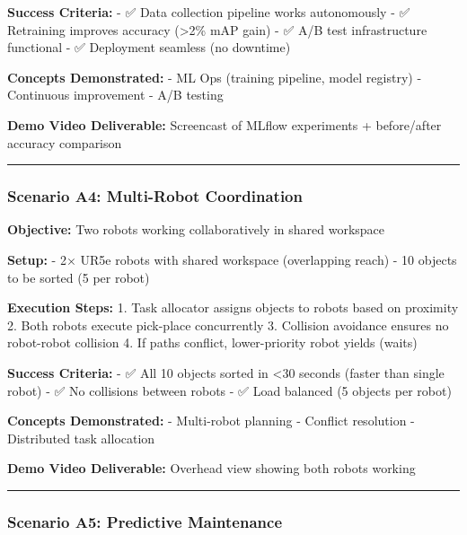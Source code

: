 \documentclass[
]{article}
\begin{document}
\textbf{Success Criteria:} - ✅ Data collection pipeline works
autonomously - ✅ Retraining improves accuracy (\textgreater2\% mAP
gain) - ✅ A/B test infrastructure functional - ✅ Deployment seamless
(no downtime)

\textbf{Concepts Demonstrated:} - ML Ops (training pipeline, model
registry) - Continuous improvement - A/B testing

\textbf{Demo Video Deliverable:} Screencast of MLflow experiments +
before/after accuracy comparison

\begin{center}\rule{0.5\linewidth}{0.5pt}\end{center}

\hypertarget{scenario-a4-multi-robot-coordination}{%
\subsubsection{Scenario A4: Multi-Robot
Coordination}\label{scenario-a4-multi-robot-coordination}}

\textbf{Objective:} Two robots working collaboratively in shared
workspace

\textbf{Setup:} - 2× UR5e robots with shared workspace (overlapping
reach) - 10 objects to be sorted (5 per robot)

\textbf{Execution Steps:} 1. Task allocator assigns objects to robots
based on proximity 2. Both robots execute pick-place concurrently 3.
Collision avoidance ensures no robot-robot collision 4. If paths
conflict, lower-priority robot yields (waits)

\textbf{Success Criteria:} - ✅ All 10 objects sorted in \textless30
seconds (faster than single robot) - ✅ No collisions between robots -
✅ Load balanced (5 objects per robot)

\textbf{Concepts Demonstrated:} - Multi-robot planning - Conflict
resolution - Distributed task allocation

\textbf{Demo Video Deliverable:} Overhead view showing both robots
working

\begin{center}\rule{0.5\linewidth}{0.5pt}\end{center}

\hypertarget{scenario-a5-predictive-maintenance}{%
\subsubsection{Scenario A5: Predictive
Maintenance}\label{scenario-a5-predictive-maintenance}}
\end{document}
